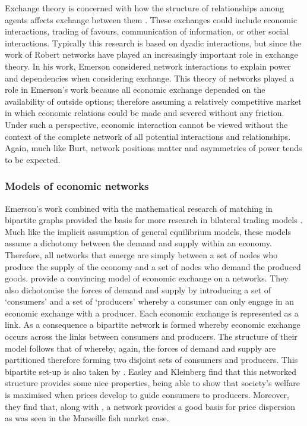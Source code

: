 Exchange theory is concerned with how the structure of relationships among agents affects exchange between them \citep{CookWhitmeyer1992}. These exchanges could include economic interactions, trading of favours, communication of information, or other social interactions. Typically this research is based on dyadic interactions, but since the work of Robert \citet{Emerson1962, Emerson1972a, Emerson1972b, Emerson1976} networks have played an increasingly important role in exchange theory. In his work, Emerson considered network interactions to explain power and dependencies when considering exchange. This theory of networks played a role in Emerson's work because all economic exchange depended on the availability of outside options; therefore assuming a relatively competitive market in which economic relations could be made and severed without any friction. Under such a perspective, economic interaction cannot be viewed without the context of the complete network of all potential interactions and relationships. Again, much like Burt, network positions matter and asymmetries of power tends to be expected.

\subsubsection{Models of economic networks}

Emerson's work combined with the mathematical research of matching in bipartite graphs \citep{Hall1935} provided the basis for more research in bilateral trading models \citep{Corominas-Bosch1999, Corominas-Bosch2004}. Much like the implicit assumption of general equilibrium models, these models assume a dichotomy between the demand and supply within an economy. Therefore, all networks that emerge are simply between a set of nodes who produce the supply of the economy and a set of nodes who demand the produced goods. \citet{Blume2009} provide a convincing model of economic exchange on a networks. They also dichotomise the forces of demand and supply by introducing a set of `consumers' and a set of `producers' whereby a consumer can only engage in an economic exchange with a producer. Each economic exchange is represented as a link. As a consequence a bipartite network is formed whereby economic exchange occurs across the links between consumers and producers. The structure of their model follows that of \citet{KrantonMinehart2001} whereby, again, the forces of demand and supply are partitioned therefore forming two disjoint sets of consumers and producers. This bipartite set-up is also taken by \citet[Chapter~10]{Jackson2008}. Easley and Kleinberg find that this networked structure provides some nice properties, being able to show that society's welfare is maximised when prices develop to guide consumers to producers. Moreover, they find that, along with \citet{Kakade2004a, Kakade2004b}, a network provides a good basis for price dispersion as was seen in the Marseille fish market case.

